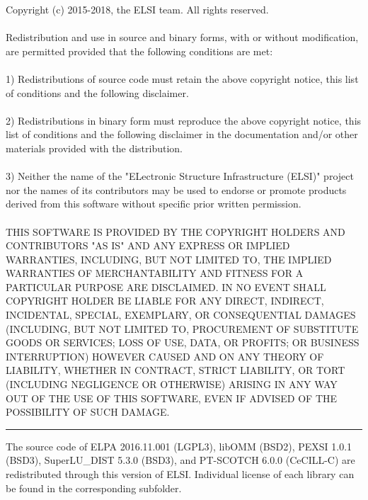 \documentclass{report}
\begin{document}
Copyright (c) 2015-2018, the ELSI team.  All rights reserved.\\
\\
Redistribution and use in source and binary forms, with or without modification, are permitted provided that the following conditions are met:\\
\\
1) Redistributions of source code must retain the above copyright notice, this list of conditions and the following disclaimer.\\
\\
2) Redistributions in binary form must reproduce the above copyright notice, this list of conditions and the following disclaimer in the documentation and/or other materials provided with the distribution.\\
\\
3) Neither the name of the "ELectronic Structure Infrastructure (ELSI)" project nor the names of its contributors may be used to endorse or promote products derived from this software without specific prior written permission.\\
\\
THIS SOFTWARE IS PROVIDED BY THE COPYRIGHT HOLDERS AND CONTRIBUTORS "AS IS" AND ANY EXPRESS OR IMPLIED WARRANTIES, INCLUDING, BUT NOT LIMITED TO, THE IMPLIED WARRANTIES OF MERCHANTABILITY AND FITNESS FOR A PARTICULAR PURPOSE ARE DISCLAIMED.  IN NO EVENT SHALL COPYRIGHT HOLDER BE LIABLE FOR ANY DIRECT, INDIRECT, INCIDENTAL, SPECIAL, EXEMPLARY, OR CONSEQUENTIAL DAMAGES (INCLUDING, BUT NOT LIMITED TO, PROCUREMENT OF SUBSTITUTE GOODS OR SERVICES; LOSS OF USE, DATA, OR PROFITS; OR BUSINESS INTERRUPTION) HOWEVER CAUSED AND ON ANY THEORY OF LIABILITY, WHETHER IN CONTRACT, STRICT LIABILITY, OR TORT (INCLUDING NEGLIGENCE OR OTHERWISE) ARISING IN ANY WAY OUT OF THE USE OF THIS SOFTWARE, EVEN IF ADVISED OF THE POSSIBILITY OF SUCH DAMAGE.\\
\bigskip
\bigskip
\noindent\rule{18cm}{0.4pt}

The source code of ELPA 2016.11.001 (LGPL3), libOMM (BSD2), PEXSI 1.0.1 (BSD3), SuperLU\_DIST 5.3.0 (BSD3), and PT-SCOTCH 6.0.0 (CeCILL-C) are redistributed through this version of ELSI.  Individual license of each library can be found in the corresponding subfolder.\\
\end{document}
